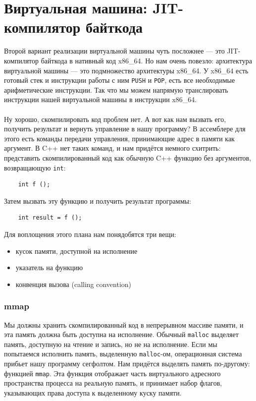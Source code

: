 \documentclass[11pt]{book}
\begin{document}
\section{Виртуальная машина: JIT-компилятор байткода}
Второй вариант реализации виртуальной машины чуть посложнее --- это JIT-компилятор байткода в нативный код x86\_64.
Но нам очень повезло: архитектура виртуальной машины --- это подмножество архитектуры x86\_64.
У x86\_64 есть готовый стек и инструкции работы с ним \texttt{PUSH} и \texttt{POP},
есть все необходимые арифметические инструкции.
Так что мы можем напрямую транслировать инструкции нашей виртуальной машины в инструкции x86\_64.
\\ \\
Ну хорошо, скомпилировать код проблем нет.
А вот как нам вызвать его, получить результат и вернуть управление в нашу программу?
В ассемблере для этого есть команды передачи управления, принимающие адрес в памяти как аргумент.
В C++ нет таких команд, и нам придётся немного схитрить: представить скомпилированный код
как обычную C++ функцию без аргументов, возвращающую \texttt{int}:
\begin{verbatim}
    int f ();
\end{verbatim}
Затем вызвать эту функцию и получить результат программы:
\begin{verbatim}
    int result = f ();
\end{verbatim}
Для воплощения этого плана нам понядобятся три вещи:
\begin{itemize}
\item кусок памяти, доступной на исполнение
\item указатель на функцию
\item конвенция вызова (calling convention)
\end{itemize}

\subsubsection{mmap}
Мы должны хранить скомпилированный код в непрерывном массиве памяти, и эта память должна быть доступна на исполнение.
Обычный \texttt{malloc} выделяет память, доступную на чтение и запись, но не на исполнение.
Если мы попытаемся исполнить память, выделенную \texttt{malloc}-ом, операционная система прибьет нашу программу сегфолтом.
Нам придётся выделять память по-другому: функцией \texttt{mmap}.
Эта функция отображает часть виртуального адресного пространства процесса на реальную память,
и принимает набор флагов, указывающих права доступа к выделенному куску памяти.
\end{document}
